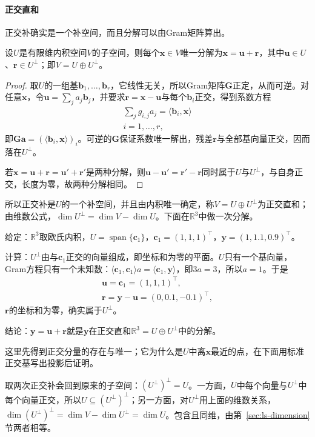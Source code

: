 \paragraph{正交直和}
正交补确实是一个补空间，而且分解可以由Gram矩阵算出。
\begin{lemma}[正交直和]
\label{lem:ls-orthogonal-decomposition}
设$U$是有限维内积空间$V$的子空间，则每个$\bm x\in V$唯一分解为$\bm x=\bm u+\bm r$，其中$\bm u\in U$、$\bm r\in U^\perp$；即$V=U\oplus U^\perp$。
\end{lemma}
\begin{proof}
取$U$的一组基$\bm b_1,\ldots,\bm b_r$，它线性无关，所以Gram矩阵$\bm G$正定，从而可逆。对任意$\bm x$，令$\bm u=\sum_j a_j\bm b_j$，并要求$\bm r=\bm x-\bm u$与每个$\bm b_i$正交，得到系数方程
\[
 \begin{gathered}
\sum_j g_{i,j}a_j=\langle\bm b_i,\bm x\rangle\\
i=1,\ldots,r,
 \end{gathered}
\]
即$\bm G\bm a=(\langle\bm b_i,\bm x\rangle)_i$。可逆的$\bm G$保证系数唯一解出，残差$\bm r$与全部基向量正交，因而落在$U^\perp$。

若$\bm x=\bm u+\bm r=\bm u'+\bm r'$是两种分解，则$\bm u-\bm u'=\bm r'-\bm r$同时属于$U$与$U^\perp$，与自身正交，长度为零，故两种分解相同。
\end{proof}
所以正交补是$U$的一个补空间，并且由内积唯一确定，称$V=U\oplus U^\perp$为正交直和；由维数公式，$\dim U^\perp=\dim V-\dim U$。下面在$\mathbb R^3$中做一次分解。
\begin{example}[向一条直线的正交分解]
\label{ex:ls-orthogonal-decomposition-line}
给定：$\mathbb R^3$取欧氏内积，$U=\operatorname{span}\{\bm c_1\}$，$\bm c_1=(1,1,1)^\top$，$\bm y=(1,1.1,0.9)^\top$。

计算：$U^\perp$由与$\bm c_1$正交的向量组成，即坐标和为零的平面。$U$只有一个基向量，Gram方程只有一个未知数：$\langle\bm c_1,\bm c_1\rangle a=\langle\bm c_1,\bm y\rangle$，即$3a=3$，所以$a=1$。于是
\[
 \begin{gathered}
 \bm u=\bm c_1=(1,1,1)^\top,
 \\
 \bm r=\bm y-\bm u=(0,0.1,-0.1)^\top,
 \end{gathered}
\]
$\bm r$的坐标和为零，确实属于$U^\perp$。

结论：$\bm y=\bm u+\bm r$就是$\bm y$在正交直和$\mathbb R^3=U\oplus U^\perp$中的分解。
\end{example}
这里先得到正交分量的存在与唯一；它为什么是$U$中离$\bm x$最近的点，在下面用标准正交基写出投影后证明。

取两次正交补会回到原来的子空间：$(U^\perp)^\perp=U$。一方面，$U$中每个向量与$U^\perp$中每个向量正交，所以$U\subseteq(U^\perp)^\perp$；另一方面，对$U^\perp$用上面的维数关系，$\dim(U^\perp)^\perp=\dim V-\dim U^\perp=\dim U$。包含且同维，由第~\ref{sec:ls-dimension}节两者相等。

